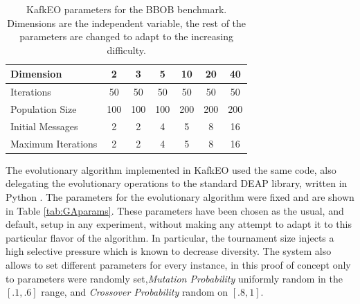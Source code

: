 \documentclass[sigconf]{acmart}
\begin{document}
\begin{table}
  \small
  \caption{KafkEO parameters for the BBOB benchmark. Dimensions are the independent variable, the rest of the parameters are changed to adapt to the increasing difficulty. }
  \label{tab:params:kafka} 
  \centering
  \small
  \begin{tabular}{|l|c|c|c|c|c|c|}
    \hline
    Dimension & 2 & 3 & 5 & 10 & 20 & 40\\ \hline
    Iterations & 50 & 50 & 50 & 50 & 50 & 50\\ \hline
    Population Size  & 100 & 100 & 100 & 200 & 200 & 200 \\ \hline
    Initial Messages & 2 & 2 & 4 & 5 & 8 & 16  \\ \hline
    Maximum Iterations & 2 & 2 & 4 & 5 & 8 & 16  \\ \hline
  \end{tabular}
\end{table}

The evolutionary algorithm implemented in KafkEO used the same code,
also delegating the evolutionary operations to the standard DEAP
library, written in 
Python \cite{fortin2012deap}. The parameters for the evolutionary algorithm were fixed and
are shown in Table \ref{tab:GAparams}. These parameters have been
chosen as the usual, and default, setup in any experiment, without
making any attempt to adapt it to this particular flavor of the
algorithm. In particular, the tournament size injects a high selective
pressure which is known to decrease diversity. The system also allows 
to set different parameters for every instance, in this proof of concept 
only to parameters were randomly set,{\em Mutation Probability} uniformly  random in the $[.1,.6]$ range, and {\em Crossover Probability} random on $[.8,1]$.

\end{document}
